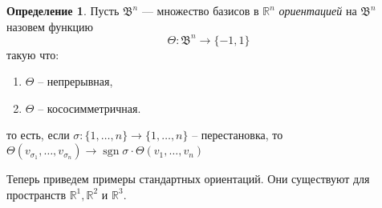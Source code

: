 \documentclass[a5paper]{article}
\newcounter{through}
\theoremstyle{plain}
\theoremstyle{definition}
\newtheorem{definition}[through]{Определение}
\numberwithin{through}{section}
\numberwithin{equation}{section}
\DeclareMathOperator{\sgn}{sgn}
\begin{document}
\begin{definition}\label{OrientationInRn}
	Пусть $\mathfrak{B}^n$ --- множество базисов в $\mathbb{R}^n$
	\textit{ориентацией} на $\mathfrak{B}^n$ назовем функцию 
	\[ \Theta: \mathfrak{B}^n \to \{-1, 1 \} \]
	такую что:
	\begin{enumerate}
		\item 
		$\Theta$ -- непрерывная,
		
		\item
		$\Theta$ -- кососимметричная.
		

	\end{enumerate}
		то есть, если $\sigma : \{ 1,\ldots, n \} \to \{ 1,\ldots, n \}$ -- перестановка, то 
$\Theta(v_{\sigma_1},\ldots, v_{\sigma_n}) \to 
\sgn \sigma \cdot\Theta(v_{1},\ldots, v_{n})$
\end{definition}

Теперь приведем примеры стандартных ориентаций. 
Они существуют для пространств $\mathbb{R}^1, \mathbb{R}^2$ и $\mathbb{R}^3$.
\end{document}
